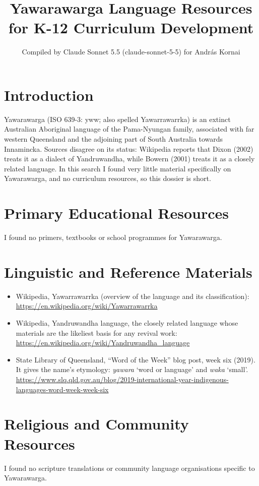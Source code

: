 \documentclass[12pt]{article}
\title{Yawarawarga Language Resources for K-12 Curriculum Development}
\author{Compiled by Claude Sonnet 5.5 (claude-sonnet-5-5) for Andr\'as Kornai}
\date{}
\begin{document}
\maketitle

\section{Introduction}
Yawarawarga (ISO 639-3: yww; also spelled Yawarrawarrka) is an extinct Australian Aboriginal language of the Pama-Nyungan family, associated with far western Queensland and the adjoining part of South Australia towards Innamincka. Sources disagree on its status: Wikipedia reports that Dixon (2002) treats it as a dialect of Yandruwandha, while Bowern (2001) treats it as a closely related language. In this search I found very little material specifically on Yawarawarga, and no curriculum resources, so this dossier is short.

\section{Primary Educational Resources}
I found no primers, textbooks or school programmes for Yawarawarga.

\section{Linguistic and Reference Materials}
\begin{itemize}
\item Wikipedia, Yawarrawarrka (overview of the language and its classification): \url{https://en.wikipedia.org/wiki/Yawarrawarrka}
\item Wikipedia, Yandruwandha language, the closely related language whose materials are the likeliest basis for any revival work: \url{https://en.wikipedia.org/wiki/Yandruwandha_language}
\item State Library of Queensland, ``Word of the Week'' blog post, week six (2019). It gives the name's etymology: \emph{yawara} `word or language' and \emph{waka} `small'. \url{https://www.slq.qld.gov.au/blog/2019-international-year-indigenous-languages-word-week-week-six}
\end{itemize}

\section{Religious and Community Resources}
I found no scripture translations or community language organisations specific to Yawarawarga.
\end{document}
